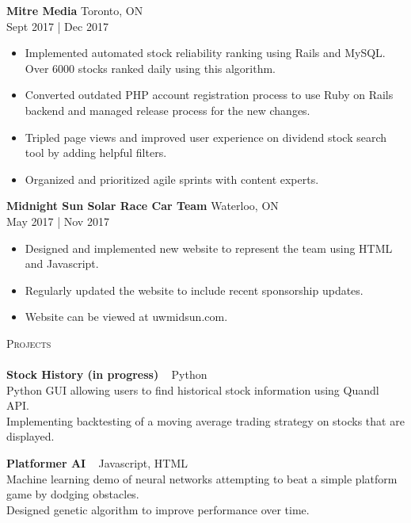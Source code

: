 \documentclass[a4paper]{article}
\newcommand{\lineunder} {
    \vspace*{-8pt} \\
    \hspace*{-18pt} \hrulefill \\
}
\newcommand{\header} [1] {
    {\hspace*{-18pt}\vspace*{6pt} \textsc{#1}}
    \vspace*{-6pt} \lineunder
}
\begin{document}
\textbf{Mitre Media} \hfill Toronto, ON\\
 \hfill Sept 2017 | Dec 2017\\
\vspace{-1mm}
\begin{itemize} \itemsep 1pt
	\item Implemented automated stock reliability ranking using Rails and MySQL. Over 6000 stocks ranked daily using this algorithm.
	\item Converted outdated PHP account registration process to use Ruby on Rails backend and managed release process for the new changes.
	\item Tripled page views and improved user experience on dividend stock search tool by adding helpful filters.
	\item Organized and prioritized agile sprints with content experts.
\end{itemize}

\textbf{Midnight Sun Solar Race Car Team} \hfill Waterloo, ON\\
 \hfill May 2017 | Nov 2017\\
\vspace{-1mm}
\begin{itemize} \itemsep 1pt
	\item Designed and implemented new website to represent the team using HTML and Javascript.
	\item Regularly updated the website to include recent sponsorship updates.
	\item Website can be viewed at uwmidsun.com.
\end{itemize}

\header{Projects}
{\textbf{Stock History (in progress)}} {\ \textbar{} Python} \\
Python GUI allowing users to find historical stock information using Quandl API.\\
Implementing backtesting of a moving average trading strategy on stocks that are displayed.\\
\vspace*{2mm}

{\textbf{Platformer AI}} {\ \textbar{} Javascript, HTML} \\
Machine learning demo of neural networks attempting to beat a simple platform game by dodging obstacles.\\
Designed genetic algorithm to improve performance over time.\\
\vspace*{2mm}
\end{document}
